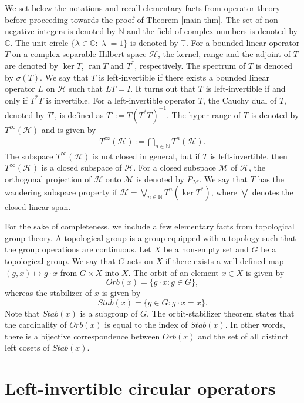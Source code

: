 \documentclass[10pt,a4paper]{amsart}
\newcommand{\beqn}{\begin{eqnarray*}}
\newcommand{\eeqn}{\end{eqnarray*}}
\begin{document}
We set below the notations and recall elementary facts from operator theory before proceeding towards the proof of Theorem \ref{main-thm}. The set of non-negative integers is denoted by $\mathbb N$ and the field of complex numbers is denoted by $\mathbb C$. The unit circle $\{\lambda \in \mathbb C : |\lambda| = 1\}$ is denoted by $\mathbb T$.
For a bounded linear operator $T$ on a complex separable Hilbert space $\mathcal H$, the kernel, range and the adjoint of $T$ are denoted by $\ker T$, $\operatorname{ran} T$ and $T^*$, respectively. The spectrum of $T$ is denoted by $\sigma(T)$. We say that $T$ is left-invertible if there exists a bounded linear operator $L$ on $\mathcal H$ such that $LT=I$. It turns out that $T$ is left-invertible if and only if $T^*T$ is invertible. For a left-invertible operator $T$, the Cauchy dual of $T$, denoted by $T'$, is defined as $T' := T(T^*T)^{-1}$. The hyper-range of $T$
is denoted by $T^\infty(\mathcal H)$ and is given by
\beqn
T^\infty(\mathcal H) := \bigcap_{n \in \mathbb N} T^n(\mathcal H).
\eeqn
The subspace $T^\infty(\mathcal H)$ is not closed in general, but if $T$ is left-invertible, then $T^\infty(\mathcal H)$ is a closed subspace of $\mathcal H$. For a closed subspace $\mathcal M$ of $\mathcal H$, the orthogonal projection of $\mathcal H$ onto $\mathcal M$ is denoted by $P_{\mathcal M}$. We say that $T$ has the wandering subspace property if $\mathcal H = \bigvee_{n \in \mathbb N} T^n(\ker T^*)$, where $\bigvee$ denotes the closed linear span.

For the sake of completeness, we include a few elementary facts from topological group theory. A topological group is a group equipped with a topology such that the group operations are continuous. Let $X$ be a non-empty set and $G$ be a topological group. We say that $G$ acts on $X$ if there exists a well-defined map $(g,x) \mapsto g\cdot x$ from $G \times X$ into $X$. The orbit of an element $x \in X$ is given by
\[Orb(x) = \{g\cdot x : g \in G\},\]
whereas the stabilizer of $x$ is given by
\[Stab(x) = \{g \in G : g\cdot x = x\}.\]
Note that $Stab(x)$ is a subgroup of $G$. The orbit-stabilizer theorem states that the cardinality of $Orb(x)$ is equal to the index of $Stab(x)$. In other words, there is a bijective correspondence between $Orb(x)$ and the set of all distinct left cosets of $Stab(x)$. 
 
\section{Left-invertible circular operators}
\end{document}
